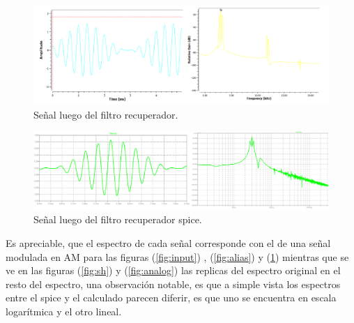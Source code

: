 \begin{figure}[H]
	\centering
	\includegraphics[width=1\textwidth]{ImagenesEjercicio7/recovery.PNG}
\caption{Señal luego del filtro recuperador.}
	\label{fig:recovery}
\end{figure}

\begin{figure}[H]
	\centering
	\includegraphics[width=1\textwidth]{ImagenesEjercicio7/srecovery.PNG}
\caption{Señal luego del filtro recuperador spice.}
	\label{fig:srecovery}
\end{figure}
Es apreciable, que el espectro de cada señal corresponde con el de una señal modulada en AM para las figuras (\ref{fig:input}) , (\ref{fig:alias}) y (\ref{fig:recovery}) mientras que se ve en las figuras (\ref{fig:sh}) y (\ref{fig:analog}) las replicas del espectro original en el resto del espectro, una observación notable, es que a simple vista los espectros entre el spice y el calculado parecen diferir, es que uno se encuentra en escala logarítmica y el otro lineal.